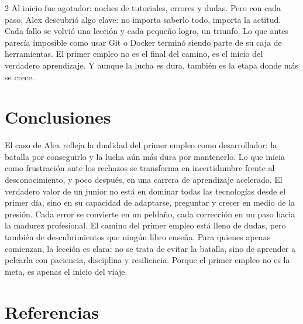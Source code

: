 \documentclass[12pt,spanish,Letterpaper,openany]{book}
\begin{document}
\begin {multicols}{2}
Al inicio fue agotador: noches de tutoriales, errores y dudas. Pero con cada paso, Alex descubrió algo clave: no importa saberlo todo, importa la actitud. Cada fallo se volvió una lección y cada pequeño logro, un triunfo. Lo que antes parecía imposible como usar Git o Docker terminó siendo parte de su caja de herramientas. El primer empleo no es el final del camino, es el inicio del verdadero aprendizaje. Y aunque la lucha es dura, también es la etapa donde más se crece.

\bigskip
\bigskip

\section{Conclusiones}\label{conclusiones-6}

El caso de Alex refleja la dualidad del primer empleo como desarrollador: la batalla por conseguirlo y la lucha aún más dura por mantenerlo. Lo que inicia como frustración ante los rechazos se transforma en incertidumbre frente al desconocimiento, y poco después, en una carrera de aprendizaje acelerado. El verdadero valor de un junior no está en dominar todas las tecnologías desde el primer día, sino en su capacidad de adaptarse, preguntar y crecer en medio de la presión. Cada error se convierte en un peldaño, cada corrección en un paso hacia la madurez profesional. El camino del primer empleo está lleno de dudas, pero también de descubrimientos que ningún libro enseña. Para quienes apenas comienzan, la lección es clara: no se trata de evitar la batalla, sino de aprender a pelearla con paciencia, disciplina y resiliencia. Porque el primer empleo no es la meta, es apenas el inicio del viaje.

\section{Referencias}\label{referencias-6}


\end{multicols}
\end{document}
